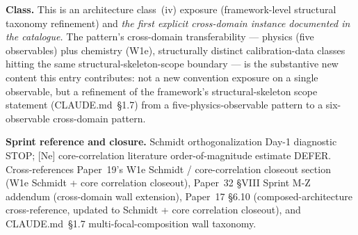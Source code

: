 \documentclass[11pt]{article}
\begin{document}
\textbf{Class.} This is an architecture class~(iv) exposure
(framework-level structural taxonomy refinement) and \emph{the
first explicit cross-domain instance documented in the catalogue.}
The pattern's cross-domain transferability --- physics (five
observables) plus chemistry (W1e), structurally distinct
calibration-data classes hitting the same structural-skeleton-scope
boundary --- is the substantive new content this entry contributes:
not a new convention exposure on a single observable, but a
refinement of the framework's structural-skeleton scope statement
(CLAUDE.md~\S1.7) from a five-physics-observable pattern to a
six-observable cross-domain pattern.

\textbf{Sprint reference and closure.} Schmidt orthogonalization
Day-1 diagnostic STOP;
[Ne] core-correlation literature order-of-magnitude estimate DEFER.
Cross-references Paper~19's W1e Schmidt / core-correlation closeout section
(W1e Schmidt + core correlation closeout), Paper~32 \S VIII Sprint
M-Z addendum (cross-domain wall extension), Paper~17 \S6.10
(composed-architecture cross-reference, updated to Schmidt + core
correlation closeout), and CLAUDE.md~\S1.7 multi-focal-composition
wall taxonomy.
\end{document}
